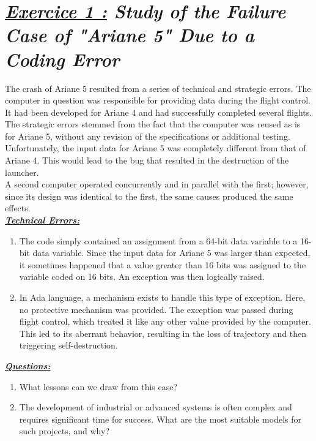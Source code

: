 \section*{\textit{\underline{Exercice 1 :} Study of the Failure Case of "Ariane 5" Due to a Coding Error}}

The crash of Ariane 5 resulted from a series of technical and strategic errors. The computer in question was responsible for
providing data during the flight control. It had been developed for Ariane 4 and had successfully completed several flights.\\

The strategic errors stemmed from the fact that the computer was reused as is for Ariane 5, without any revision of the
specifications or additional testing. Unfortunately, the input data for Ariane 5 was completely different from that of Ariane 4.
This would lead to the bug that resulted in the destruction of the launcher.\\

A second computer operated concurrently and in parallel with the first; however, since its design was identical to the first,
the same causes produced the same effects.\\

\textbf{\underline{\textit{Technical Errors:}}}
\begin{enumerate}
    \item The code simply contained an assignment from a 64-bit data variable to a 16-bit data variable. Since the input data for Ariane 5 was larger than expected, it sometimes happened that a value greater than 16 bits was assigned to the variable coded on 16 bits. An exception was then logically raised.
    \item In Ada language, a mechanism exists to handle this type of exception. Here, no protective mechanism was provided. The exception was passed during flight control, which treated it like any other value provided by the computer. This led to its aberrant behavior, resulting in the loss of trajectory and then triggering self-destruction.\\
\end{enumerate}

\textbf{\underline{\textit{Questions:}}}
\begin{enumerate}
    \item What lessons can we draw from this case?
    \item The development of industrial or advanced systems is often complex and requires significant time for success. What are
the most suitable models for such projects, and why?
\end{enumerate}

